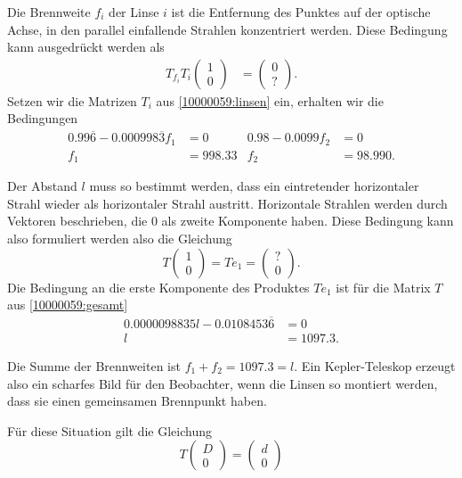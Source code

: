 \begin{loesung}
\begin{teilaufgaben}
\item 
Die Brennweite $f_i$ der Linse $i$ ist die Entfernung des Punktes auf
der optische Achse, in den parallel einfallende Strahlen konzentriert werden.
Diese Bedingung kann ausgedrückt werden als
\begin{align*}
T_{f_i} T_i\begin{pmatrix}1\\0\end{pmatrix} &= \begin{pmatrix} 0\\?\end{pmatrix}.
\end{align*}
Setzen wir die Matrizen $T_i$ aus \eqref{10000059:linsen} ein, erhalten wir
die Bedingungen
\begin{align*}
0.99\overline{6} - 0.000998\overline{3} f_1 &= 0
&
0.98 - 0.0099 f_2 &= 0
\\
f_1 &= 998.33
&
f_2 &= 98.990.
\end{align*}
\item
Der Abstand $l$ muss so bestimmt werden, dass ein eintretender horizontaler
Strahl wieder als horizontaler Strahl austritt.
Horizontale Strahlen werden durch Vektoren beschrieben, die $0$ als
zweite Komponente haben.
Diese Bedingung kann also formuliert werden also die Gleichung
\[
T\begin{pmatrix}1\\0\end{pmatrix} = Te_1 = \begin{pmatrix}?\\0\end{pmatrix}.
\]
Die Bedingung an die erste Komponente des Produktes $Te_1$ ist für die
Matrix $T$ aus \eqref{10000059:gesamt}
\begin{align*}
0.0000098835 l - 0.0108453\overline{6} &= 0
\\
l&=1097.3.
\end{align*}
\item
Die Summe der Brennweiten ist $f_1+f_2 = 1097.3 = l$.
Ein Kepler-Teleskop erzeugt also ein scharfes Bild für den Beobachter,
wenn die Linsen so montiert werden, dass sie einen gemeinsamen
Brennpunkt haben.
\item
Für diese Situation gilt die Gleichung
\[
T\begin{pmatrix}D\\0\end{pmatrix}=\begin{pmatrix}d\\0\end{pmatrix}
\]
\end{teilaufgaben}
\end{loesung}
